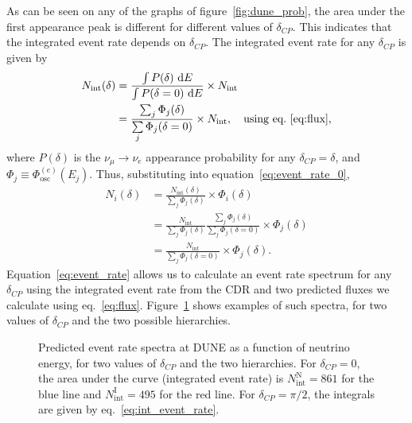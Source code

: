 As can be seen on any of the graphs of figure~\ref{fig:dune_prob}, the area under the first
appearance peak is different for different values of $\delta_{CP}$. This
indicates that the integrated event rate depends on $\delta_{CP}$.
The integrated event rate for any $\delta_{CP}$ is given by
\begin{align}
	N_\text{int} (\delta) &= \frac{\int P (
	\delta)~\mathrm{d} E}{\int P (
	\delta=0)~\mathrm{d} E} \times N_\text{int}\nonumber\\
		&= \frac{\sum_j \Phi_j (\delta) }{\sum\limits_j \Phi_j (\delta=0)} \times
	N_\text{int},\quad\text{using eq.~\ref{eq:flux},}\label{eq:int_event_rate}
\end{align}
where $P(\delta)$ is the $\nu_\mu\rightarrow\nu_e$ appearance probability
for any $\delta_{CP}=\delta$, and $\Phi_j \equiv \Phi^{(e)}_\text{osc}(E_j)$.
Thus, substituting into equation~\ref{eq:event_rate_0},
\begin{align}
	N_i (\delta) &= \frac{N_\text{int}(\delta)}{\sum\limits_j \Phi_j (\delta)}
	\times \Phi_i (\delta)\nonumber\\
	&= \frac{N_\text{int}}{\sum\limits_j \Phi_j (\delta)} \frac{\sum_j \Phi_j
	(\delta)}{\sum\limits_j \Phi_j (\delta=0)} \times \Phi_j(\delta)\nonumber\\
	&= \frac{N_\text{int}}{\sum\limits_j \Phi_j (\delta=0)} \times
	\Phi_j(\delta).\label{eq:event_rate}
\end{align}
Equation~\ref{eq:event_rate} allows us to calculate an event rate spectrum
for any $\delta_{CP}$ using the integrated event rate from the CDR and two
predicted fluxes we calculate using eq.~\ref{eq:flux}.
Figure~\ref{fig:event_rate} shows examples of such spectra, for two values of
$\delta_{CP}$ and the two possible hierarchies.
\begin{figure}
	\centering
	\caption{Predicted event rate spectra at DUNE as a function of neutrino energy, for
	two values of $\delta_{CP}$ and the two hierarchies. For $\delta_{CP}=0$, the
	area under the curve (integrated event rate) is $N^\text{N}_\text{int}=861$ for the
	blue line and
	$N^\text{I}_\text{int}=495$ for the red line. For
	$\delta_{CP}=\pi/2$, the integrals are given by eq.~\ref{eq:int_event_rate}.}
\label{fig:event_rate}
\end{figure}

